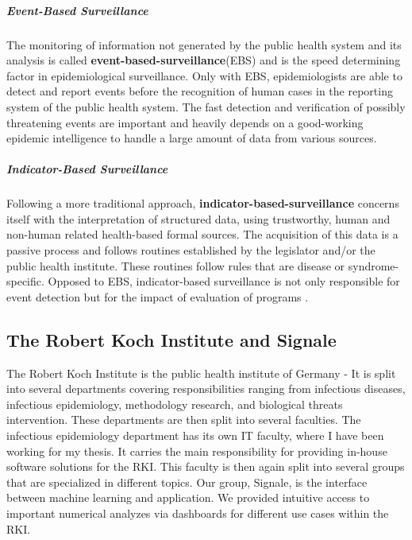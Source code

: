 \subparagraph{Event-Based Surveillance}
The monitoring of information not generated by the public health system and its analysis is called \textbf{event-based-surveillance}(\gls{EBS}) and is the speed determining factor in epidemiological surveillance. Only with EBS, epidemiologists are able to detect and report events before the recognition of human cases in the reporting system of the public health system\citep{EarlyDetection}. The fast detection and verification of possibly threatening events are important and heavily depends on a good-working epidemic intelligence to handle a large amount of data from various sources.

\subparagraph{Indicator-Based Surveillance}
Following a more traditional approach, \textbf{indicator-based-surveillance} concerns itself with the interpretation of structured data, using trustworthy, human and non-human related health-based formal sources\citep{EarlyDetection}. The acquisition of this data is a passive process and follows routines established by the legislator and/or the public health institute. These routines follow rules that are disease or syndrome-specific. Opposed to EBS, indicator-based surveillance is not only responsible for event detection but for the impact of evaluation of programs \citep{EarlyDetection}.


\subsection{The Robert Koch Institute and Signale}
The Robert Koch Institute is the public health institute of Germany - It is
split into several departments covering responsibilities ranging from infectious diseases, infectious epidemiology, methodology research, and biological threats intervention.
These departments are then split into several faculties. The infectious epidemiology department has its own IT faculty,
where I have been working for my thesis. It carries the main responsibility for providing in-house software solutions for the RKI. This faculty is then again split into several groups that are specialized in different topics.
Our group, Signale, is the interface between machine learning and application.
We provided intuitive access to important numerical analyzes via dashboards for different use cases within the RKI.

